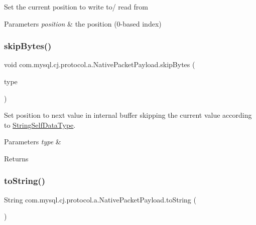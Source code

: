 Set the current position to write to/ read from


\begin{DoxyParams}{Parameters}
{\em position} & the position (0-\/based index) \\
\hline
\end{DoxyParams}
\mbox{\label{classcom_1_1mysql_1_1cj_1_1protocol_1_1a_1_1_native_packet_payload_afea96a6e9c4a2fc5e4faf2582a0899b1}} 
\subsubsection{\texorpdfstring{skip\+Bytes()}{skipBytes()}}
{\footnotesize\ttfamily void com.\+mysql.\+cj.\+protocol.\+a.\+Native\+Packet\+Payload.\+skip\+Bytes (\begin{DoxyParamCaption}\item[{String\+Self\+Data\+Type}]{type }\end{DoxyParamCaption})}

Set position to next value in internal buffer skipping the current value according to \mbox{\hyperlink{}{String\+Self\+Data\+Type}}.


\begin{DoxyParams}{Parameters}
{\em type} & \\
\hline
\end{DoxyParams}
\begin{DoxyReturn}{Returns}

\end{DoxyReturn}
\mbox{\label{classcom_1_1mysql_1_1cj_1_1protocol_1_1a_1_1_native_packet_payload_a5cf38824eb92c94a8282c2c5a4176807}} 
\subsubsection{\texorpdfstring{to\+String()}{toString()}}
{\footnotesize\ttfamily String com.\+mysql.\+cj.\+protocol.\+a.\+Native\+Packet\+Payload.\+to\+String (\begin{DoxyParamCaption}{ }\end{DoxyParamCaption})}

